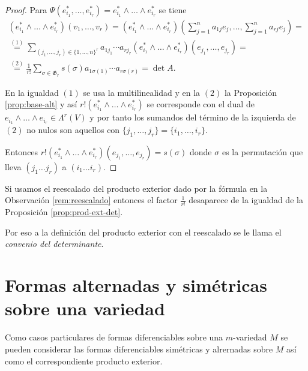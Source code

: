 \documentclass[\main/VD_completo.tex]{subfiles}
\begin{document}
\begin{proof}
  Para \(\Psi(e_{i_{1}}^{*},\dots,e_{i_{r}}^{*})=e_{i_{1}}^{*}\wedge\dots\wedge
  e_{i_{r}}^{*}\) se tiene
  \[
    \begin{array}{l}
       (e_{i_{1}}^{*}\wedge\dots\wedge e_{i_{r}}^{*})(v_{1},\dots,v_{r})=(e_{i_{1}}^{*}
    \wedge\dots\wedge e_{i_{r}}^{*})(\sum_{j=1}^{n}a_{1j}e_{j},
    \dots,\sum_{j=1}^{n}a_{rj}e_{j})= \\
      \overset{(1)}{=}
      \sum_{(j_{1},\dots,j_{r})\in\{1,\dots,n\}^{r}}a_{1j_{1}}\cdots a_{rj_{r}}
    (e_{i_{1}}^{*}\wedge\dots\wedge e_{i_{r}}^{*})(e_{j_{1}},
    \dots,e_{j_{r}})= \\
    \overset{(2)}{=}\frac{1}{r!}\sum_{\sigma\in \mathfrak{G}_{r}}s(\sigma) a_{1\sigma(1)}
    \cdots a_{r\sigma(r)}=\det{A}.
    \end{array}
  \]

  En la igualdad \((1)\) se usa la multilinealidad y en la \((2)\) la
  Proposición \ref{prop:base-alt} y así \(r!(e_{i_{1}}^{*}\wedge\dots\wedge
  e_{i_{r}}^{*})\) se corresponde con el dual de \(e_{i_{1}}\wedge\dots\wedge
  e_{i_{r}}\in\Lambda^{r}(V)\) y por tanto los sumandos del término de la
  izquierda de \((2)\) no nulos son aquellos con
  \(\{j_{1},\dots,j_{r}\}=\{i_{1},\dots,i_{r}\}\).

  Entonces \(r!(e_{i_{1}}^{*}\wedge\dots\wedge
  e_{i_{r}}^{*})(e_{j_{1}},\dots,e_{j_{r}})= s(\sigma)\) donde \(\sigma\) es
  la permutación que lleva \((j_{1}\dots j_{r})\) a \((i_{1}\dots i_{r})\).
\end{proof}

\begin{remark}
  Si usamos el reescalado del producto exterior dado por la fórmula en la
  Observación \ref{rem:reescalado} entonces el factor \(\frac{1}{r!}\) desaparece de la
  igualdad de la Proposición \ref{prop:prod-ext-det}.

  Por eso a la definición del producto exterior con el reescalado se le llama el
  \emph{convenio del determinante}.
\end{remark}

\section{Formas alternadas y simétricas sobre una variedad}

Como casos particulares de formas diferenciables sobre una \(m\)-variedad \(M\)
se pueden considerar las formas diferenciables simétricas y alrernadas sobre
\(M\) así como el correspondiente producto exterior.
\end{document}
